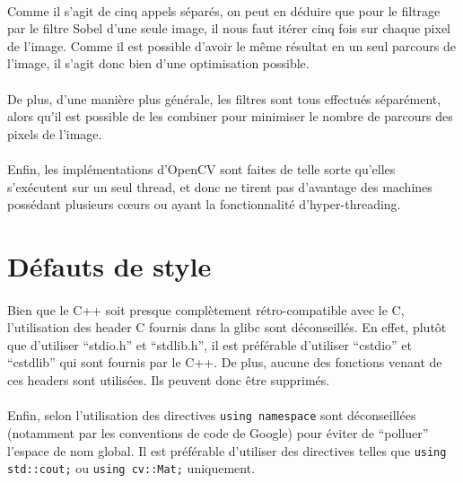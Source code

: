 \documentclass{report}
\begin{document}
\paragraph{} Comme il s'agit de cinq appels séparés, on peut en déduire que
pour le filtrage par le filtre Sobel d'une seule image, il nous faut itérer
cinq fois sur chaque pixel de l'image. Comme il est possible d'avoir le même
résultat en un seul parcours de l'image, il s'agit donc bien d'une optimisation
possible.

\paragraph{} De plus, d'une manière plus générale, les filtres sont tous
effectués séparément, alors qu'il est possible de les combiner pour minimiser
le nombre de parcours des pixels de l'image.

\paragraph{} Enfin, les implémentations d'OpenCV sont faites de telle sorte
qu'elles s'exécutent sur un seul thread, et donc ne tirent pas d'avantage des
machines possédant plusieurs cœurs ou ayant la fonctionnalité
d'hyper-threading.

\section{Défauts de style}

\paragraph{} Bien que le C++ soit presque complètement rétro-compatible avec le
C, l'utilisation des header C fournis dans la glibc sont déconseillés. En
effet, plutôt que d'utiliser ``stdio.h'' et ``stdlib.h'', il est préférable
d'utiliser ``cstdio'' et ``cstdlib'' qui sont fournis par le C++. De plus,
aucune des fonctions venant de ces headers sont utilisées. Ils peuvent donc
être supprimés.

\paragraph{} Enfin, selon l'utilisation des directives
\texttt{using namespace} sont déconseillées (notamment par les
conventions de code de Google) pour éviter de ``polluer'' l'espace de nom
global. Il est préférable d'utiliser des directives telles que
\texttt{using std::cout;} ou \texttt{using cv::Mat;}
uniquement.
\end{document}
